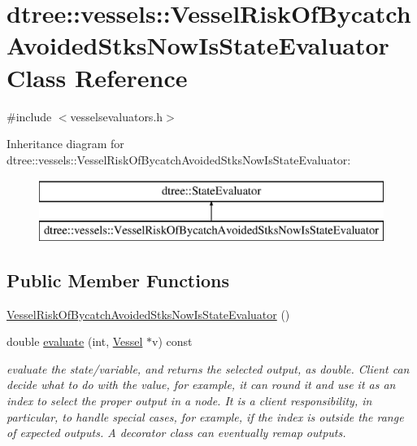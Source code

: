 \hypertarget{classdtree_1_1vessels_1_1_vessel_risk_of_bycatch_avoided_stks_now_is_state_evaluator}{}\section{dtree\+::vessels\+::Vessel\+Risk\+Of\+Bycatch\+Avoided\+Stks\+Now\+Is\+State\+Evaluator Class Reference}
\label{classdtree_1_1vessels_1_1_vessel_risk_of_bycatch_avoided_stks_now_is_state_evaluator}


{\ttfamily \#include $<$vesselsevaluators.\+h$>$}

Inheritance diagram for dtree\+::vessels\+::Vessel\+Risk\+Of\+Bycatch\+Avoided\+Stks\+Now\+Is\+State\+Evaluator\+:\begin{figure}[H]
\begin{center}
\leavevmode
\includegraphics[height=2.000000cm]{db/d3d/classdtree_1_1vessels_1_1_vessel_risk_of_bycatch_avoided_stks_now_is_state_evaluator}
\end{center}
\end{figure}
\subsection*{Public Member Functions}
\begin{DoxyCompactItemize}
\item 
\mbox{\hyperlink{classdtree_1_1vessels_1_1_vessel_risk_of_bycatch_avoided_stks_now_is_state_evaluator_a91d5752297c2430f60bfbb073cc50ba6}{Vessel\+Risk\+Of\+Bycatch\+Avoided\+Stks\+Now\+Is\+State\+Evaluator}} ()
\item 
double \mbox{\hyperlink{classdtree_1_1vessels_1_1_vessel_risk_of_bycatch_avoided_stks_now_is_state_evaluator_a19426fe129cf6b4f546b829ac6caa9f3}{evaluate}} (int, \mbox{\hyperlink{class_vessel}{Vessel}} $\ast$v) const
\begin{DoxyCompactList}\small\item\em evaluate the state/variable, and returns the selected output, as double. Client can decide what to do with the value, for example, it can round it and use it as an index to select the proper output in a node. It is a client responsibility, in particular, to handle special cases, for example, if the index is outside the range of expected outputs. A decorator class can eventually remap outputs. \end{DoxyCompactList}\end{DoxyCompactItemize}


